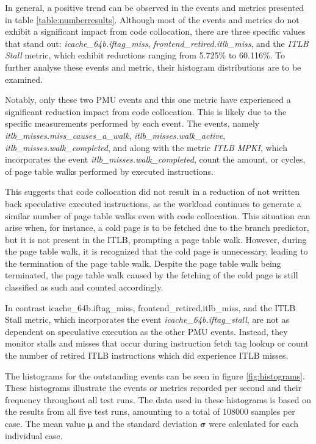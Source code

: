 In general, a positive trend can be observed in the events and metrics presented in table \ref{table:numberresults}. Although most of the events and metrics do not exhibit a significant impact from code collocation, there are three specific values that stand out: \textit{icache\_64b.iftag\_miss}, \textit{frontend\_retired.itlb\_miss}, and the \textit{ITLB Stall} metric, which exhibit reductions ranging from 5.725\% to 60.116\%. To further analyse these events and metric, their histogram distributions are to be examined.

Notably, only these two PMU events and this one metric have experienced a significant reduction impact from code collocation. This is likely due to the specific measurements performed by each event. The events, namely \textit{itlb\_misses.miss\_causes\_a\_walk}, \textit{itlb\_misses.walk\_active}, \\\textit{itlb\_misses.walk\_completed}, and along with the metric \textit{ITLB MPKI}, which incorporates the event \textit{itlb\_misses.walk\_completed}, count the amount, or cycles, of page table walks performed by executed instructions. 

This suggests that code collocation did not result in a reduction of not written back speculative executed instructions, as the workload continues to generate a similar number of page table walks even with code collocation. This situation can arise when, for instance, a cold page is to be fetched due to the branch predictor, but it is not present in the ITLB, prompting a page table walk. However, during the page table walk, it is recognized that the cold page is unnecessary, leading to the termination of the page table walk. Despite the page table walk being terminated, the page table walk caused by the fetching of the cold page is still classified as such and counted accordingly.

\newpage

In contrast icache\_64b.iftag\_miss, frontend\_retired.itlb\_miss, and the ITLB Stall metric, which incorporates the event \textit{icache\_64b.iftag\_stall}, are not as dependent on speculative execution as the other PMU events. Instead, they monitor stalls and misses that occur during instruction fetch tag lookup or count the number of retired ITLB instructions which did experience ITLB misses.

The histograms for the outstanding events can be seen in figure \ref{fig:histograms}. These histograms illustrate the events or metrics recorded per second and their frequency throughout all test runs. The data used in these histograms is based on the results from all five test runs, amounting to a total of 108000 samples per case. The mean value $\boldsymbol\mu$ and the standard deviation $\boldsymbol\sigma$ were calculated for each individual case.

